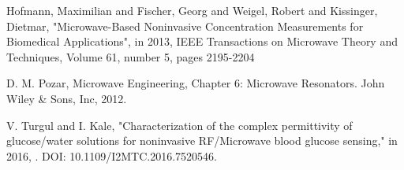 \documentclass[10pt,final,conference,a4paper,twocolumn]{IEEEtran_AntennEMB_GigaHertz2016}
\begin{document}

\begin{thebibliography}{99}
	
	
	
	 Hofmann, Maximilian and Fischer, Georg and Weigel, Robert and Kissinger, Dietmar, "Microwave-Based Noninvasive Concentration Measurements for Biomedical Applications", in 2013, IEEE Transactions on Microwave Theory and Techniques, Volume 61, number 5, pages 2195-2204
	
	 D. M. Pozar, Microwave Engineering, Chapter 6: Microwave Resonators. John Wiley \& Sons,
	Inc, 2012.
	
	 V. Turgul and I. Kale, "Characterization of the complex permittivity of glucose/water solutions for noninvasive RF/Microwave blood glucose sensing," in 2016, . DOI: 10.1109/I2MTC.2016.7520546.
\end{thebibliography}


\end{document}
